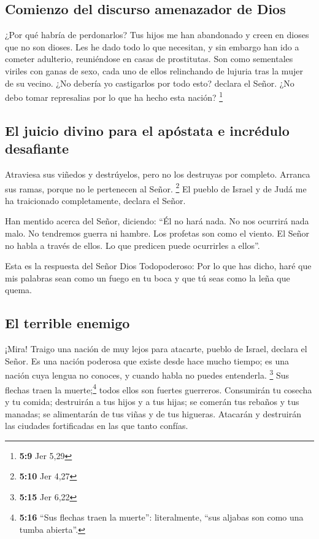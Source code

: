 \hypertarget{comienzo-del-discurso-amenazador-de-dios}{%
\subsection{Comienzo del discurso amenazador de
Dios}\label{comienzo-del-discurso-amenazador-de-dios}}

 ¿Por qué habría de perdonarlos? Tus hijos me han
abandonado y creen en dioses que no son dioses. Les he dado todo lo que
necesitan, y sin embargo han ido a cometer adulterio, reuniéndose en
casas de prostitutas.  Son como sementales viriles con
ganas de sexo, cada uno de ellos relinchando de lujuria tras la mujer de
su vecino.  ¿No debería yo castigarlos por todo esto?
declara el Señor. ¿No debo tomar represalias por lo que ha hecho esta
nación? \footnote{\textbf{5:9} Jer 5,29}

\hypertarget{el-juicio-divino-para-el-apuxf3stata-e-incruxe9dulo-desafiante}{%
\subsection{El juicio divino para el apóstata e incrédulo
desafiante}\label{el-juicio-divino-para-el-apuxf3stata-e-incruxe9dulo-desafiante}}

 Atraviesa sus viñedos y destrúyelos, pero no los
destruyas por completo. Arranca sus ramas, porque no le pertenecen al
Señor. \footnote{\textbf{5:10} Jer 4,27}  El pueblo de
Israel y de Judá me ha traicionado completamente, declara el Señor.

 Han mentido acerca del Señor, diciendo: ``Él no hará
nada. No nos ocurrirá nada malo. No tendremos guerra ni hambre.
 Los profetas son como el viento. El Señor no habla a
través de ellos. Lo que predicen puede ocurrirles a ellos''.

 Esta es la respuesta del Señor Dios Todopoderoso: Por lo
que has dicho, haré que mis palabras sean como un fuego en tu boca y que
tú seas como la leña que quema.

\hypertarget{el-terrible-enemigo}{%
\subsection{El terrible enemigo}\label{el-terrible-enemigo}}

 ¡Mira! Traigo una nación de muy lejos para atacarte,
pueblo de Israel, declara el Señor. Es una nación poderosa que existe
desde hace mucho tiempo; es una nación cuya lengua no conoces, y cuando
habla no puedes entenderla. \footnote{\textbf{5:15} Jer 6,22}
 Sus flechas traen la muerte;\footnote{\textbf{5:16}
  ``Sus flechas traen la muerte'': literalmente, ``sus aljabas son como
  una tumba abierta''.} todos ellos son fuertes guerreros.
 Consumirán tu cosecha y tu comida; destruirán a tus
hijos y a tus hijas; se comerán tus rebaños y tus manadas; se
alimentarán de tus viñas y de tus higueras. Atacarán y destruirán las
ciudades fortificadas en las que tanto confías.

